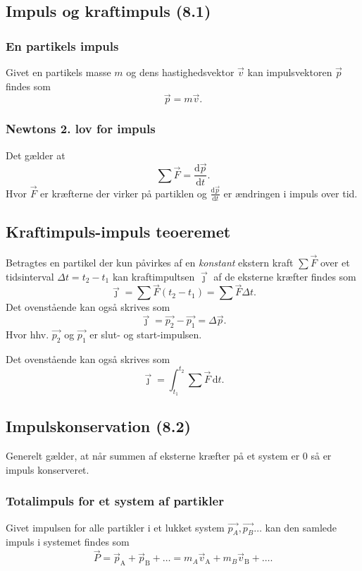 \subsection{Impuls og kraftimpuls (8.1)}

\subsubsection{En partikels impuls} \label{afs:imp}
Givet en partikels masse $m$ og dens hastighedsvektor $\Vec{v}$ kan impulsvektoren $\Vec{p}$ findes som
\[ 
\Vec{p} = m \Vec{v}
.\]

\subsubsection{Newtons 2. lov for impuls} \label{afs:new2imp}
Det gælder at
\[ 
\sum \Vec{F} = \frac{\mathrm{d}\Vec{p}}{\mathrm{d}t} 
.\]
Hvor $\Vec{F}$ er kræfterne der virker på partiklen og $\frac{\mathrm{d}\Vec{p}}{\mathrm{d}t}$ er ændringen i impuls over tid.

\subsection{Kraftimpuls-impuls teoeremet} \label{afs:krimpimptheo}
Betragtes en partikel der kun påvirkes af en \textit{konstant} ekstern kraft $\sum \Vec{F}$ over et tidsinterval $\Delta t = t_2 - t_1$ kan kraftimpultsen $\Vec{\jmath}$ af de eksterne kræfter findes som
\[ 
\Vec{\jmath} = \sum \Vec{F} (t_2 - t_1) = \sum \Vec{F} \Delta t
.\]
Det ovenstående kan også skrives som
\[ 
\Vec{\jmath} = \Vec{p_2} - \Vec{p_1} = \Delta \Vec{p}
.\]
Hvor hhv. $\Vec{p_2}$ og $\Vec{p_1}$ er slut- og start-impulsen.

Det ovenstående kan også skrives som
\[ 
\Vec{\jmath} = \int_{t_1}^{t_2}  \sum \Vec{F} \, \mathrm{d}t 
.\]

\subsection{Impulskonservation (8.2)} 
Generelt gælder, at når summen af eksterne kræfter på et system er 0 så er impuls konserveret.

\subsubsection{Totalimpuls for et system af partikler} \label{afs:totimp}
Givet impulsen for alle partikler i et lukket system $\Vec{p_A}, \Vec{p_B}\ldots $ kan den samlede impuls i systemet findes som
\[
\Vec{P} = \Vec{p}_{\text{A}} + \Vec{p}_{\text{B}} + \ldots = m_A \Vec{v}_{\text{A}} + m_B \Vec{v}_{\text{B}} +\ldots 
.\]



